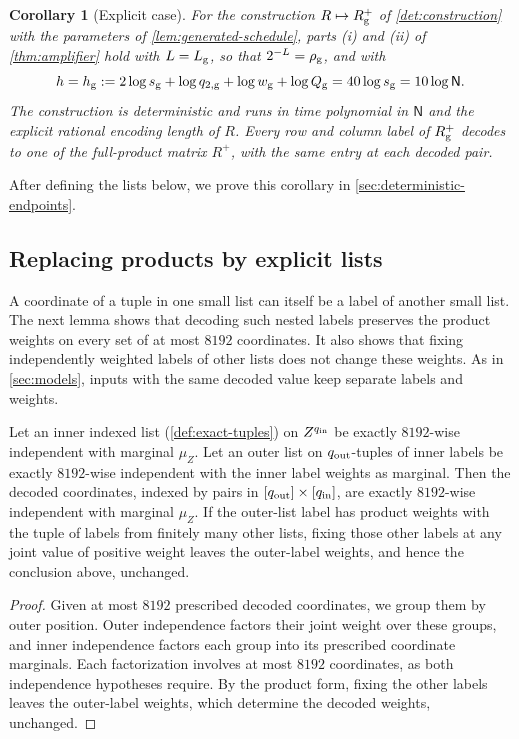 \documentclass[11pt,letterpaper]{article} \usepackage[utf8]{inputenc}
\theoremstyle{plain} \newtheorem{theorem}{Theorem}[section]
\newtheorem{corollary}[corollary]{Corollary} \aliascntresetthe{corollary}
\theoremstyle{definition} \newaliascnt{definition}{theorem}
\begin{document}
\begin{corollary}[Explicit case]\label{det:amplifier}
For the construction \(R\mapsto R_{\rm g}^{+}\) of \cref{det:construction} with the
parameters of \cref{lem:generated-schedule}, parts (i) and (ii) of
\cref{thm:amplifier} hold with \(L=L_{\rm g}\), so that \(2^{-L}=\rho_{\rm g}\), and with
\[
h=h_{\rm g}:=2\log s_{\rm g}+\log q_{2,\rm g}+\log w_{\rm g}+\log Q_{\rm g}
=40\log s_{\rm g}=10\log\mathsf N.
\]
The construction is deterministic and runs in time polynomial in \(\mathsf N\) and the
explicit rational encoding length of \(R\). Every row and column label of \(R_{\rm g}^{+}\)
decodes to one of the full-product matrix \(R^+\), with the same entry at each decoded pair.
\end{corollary}

After defining the lists below, we prove this corollary in
\cref{sec:deterministic-endpoints}.

\subsection{Replacing products by explicit lists}

A coordinate of a tuple in one small list can itself be a label of another
small list. The next lemma shows that decoding such nested labels preserves
the product weights on every set of at most $8192$ coordinates. It also shows that
fixing independently weighted labels of other lists does not change these weights.
As in \cref{sec:models}, inputs with the same decoded value keep separate
labels and weights.

\begin{lemma}\label{det:flat}
Let an inner indexed list (\cref{def:exact-tuples}) on \(Z^{q_{\rm in}}\) be exactly \(8192\)-wise independent
with marginal \(\mu_Z\). Let an outer list on \(q_{\rm out}\)-tuples of inner labels be
exactly \(8192\)-wise independent with the inner label weights as marginal.
Then the decoded coordinates, indexed by pairs in \([q_{\rm out}]\times[q_{\rm in}]\), are exactly
\(8192\)-wise independent with marginal \(\mu_Z\). If the outer-list label
has product weights with the tuple of labels from finitely many other lists,
fixing those other labels at any joint value of positive weight leaves the
outer-label weights, and hence the conclusion above, unchanged.
\end{lemma}

\begin{proof}
Given at most $8192$ prescribed decoded coordinates, we group them by
outer position. Outer independence factors their joint weight over
these groups, and inner independence factors each group into its prescribed
coordinate marginals. Each factorization involves at most $8192$ coordinates,
as both independence hypotheses require.
By the product form, fixing the other labels leaves the outer-label weights,
which determine the decoded weights, unchanged.
\end{proof}
\end{document}
